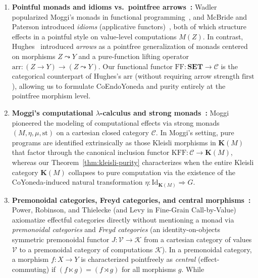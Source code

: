 \documentclass[11pt,a4paper]{article}
\theoremstyle{definition}
\theoremstyle{remark}
\newcommand{\Set}{\mathbf{SET}}
\newcommand{\Id}{\mathrm{Id}}
\newcommand{\FF}{\mathrm{FF}}
\newcommand{\KFF}{\mathrm{KFF}}
\newcommand{\K}{\mathbf{K}}
\begin{document}
\begin{enumerate}[label=(\arabic*),nosep]
  \item \textbf{Pointful monads and idioms vs.\ pointfree arrows~\cite{Wadler1992,Wadler1995,Hughes2000,McBridePaterson2008}:}
  Wadler popularized Moggi's monads in functional programming~\cite{Wadler1992,Wadler1995}, and
  McBride and Paterson introduced \emph{idioms} (applicative functors)~\cite{McBridePaterson2008},
  both of which structure effects in a pointful style on value-level computations $M(Z)$. In
  contrast, Hughes~\cite{Hughes2000} introduced \emph{arrows} as a pointfree generalization of
  monads centered on morphisms $Z \leadsto Y$ and a pure-function lifting operator
  $\mathrm{arr} : (Z \to Y) \to (Z \leadsto Y)$. Our functional functor $\FF : \Set \to \mathcal{C}$
  is the categorical counterpart of Hughes's $\mathrm{arr}$ (without requiring arrow strength
  $\mathrm{first}$), allowing us to formulate CoEndoYoneda and purity entirely at the pointfree
  morphism level.
\vspace{4pt}
  \item \textbf{Moggi's computational $\lambda$-calculus and strong monads~\cite{Moggi1991}:}
  Moggi pioneered the modeling of computational effects via strong monads $(M, \eta, \mu, \mathrm{st})$
  on a cartesian closed category $\mathcal{C}$. In Moggi's setting, pure programs are identified
  extrinsically as those Kleisli morphisms in $\K(M)$ that factor through the canonical inclusion
  functor $\KFF : \mathcal{C} \to \K(M)$, whereas our Theorem~\ref{thm:kleisli-purity} characterizes
  when the entire Kleisli category $\K(M)$ collapses to pure computation via the existence of the
  CoYoneda-induced natural transformation $\eta : \Id_{\K(M)} \Rightarrow G$.
\vspace{4pt}
  \item \textbf{Premonoidal categories, Freyd categories, and central morphisms~\cite{PowerRobinson1997,PowerThielecke1999,LevyPowerThielecke2003}:}
  Power, Robinson, and Thielecke (and Levy in Fine-Grain Call-by-Value) axiomatize effectful
  categories directly without mentioning a monad via \emph{premonoidal categories} and \emph{Freyd
  categories} (an identity-on-objects symmetric premonoidal functor $J : \mathcal{V} \to \mathcal{K}$
  from a cartesian category of values $\mathcal{V}$ to a premonoidal category of computations
  $\mathcal{K}$). In a premonoidal category, a morphism $f : X \to Y$ is characterized pointfreely as
  \emph{central} (effect-commuting) if $(f \ltimes g) = (f \rtimes g)$ for all morphisms $g$. While

\end{enumerate}
\end{document}
